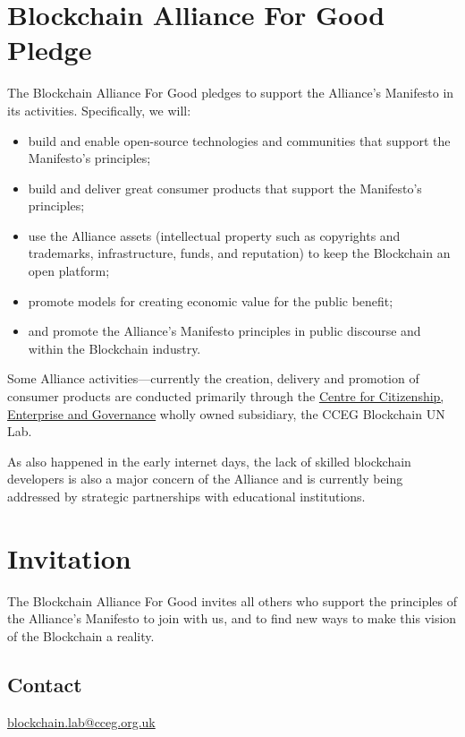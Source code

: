 \documentclass[twoside,twocolumn]{article}
\begin{document}
\section{Blockchain Alliance For Good Pledge}
The Blockchain Alliance For Good pledges to support the Alliance's Manifesto in
its activities. Specifically, we will:

\begin{itemize}
  \item build and enable open-source technologies and communities that support
  the Manifesto’s principles;
  \item build and deliver great consumer products that support the Manifesto’s
  principles;
  \item use the Alliance assets (intellectual property such as copyrights and
  trademarks, infrastructure, funds, and reputation) to keep the Blockchain an
  open platform;
  \item promote models for creating economic value for the public benefit;
  \item and promote the Alliance's Manifesto principles in public discourse and
  within the Blockchain industry.
\end{itemize}

Some Alliance activities—currently the creation, delivery and promotion of
consumer products are conducted primarily through the
\href{www.cceg.org.uk}{Centre for Citizenship, Enterprise and Governance} wholly
owned subsidiary, the CCEG Blockchain UN Lab.

As also happened in the early internet days, the lack of skilled
blockchain developers is also a major concern of the Alliance and is currently
being addressed by strategic partnerships with educational institutions.

\section{Invitation}

The Blockchain Alliance For Good invites all others who support the principles of the
Alliance's Manifesto to join with us, and to find new ways to make this vision
of the Blockchain a reality.

\subsection{Contact}

\href{mailto:blockchain.lab@cceg.org.uk}{blockchain.lab@cceg.org.uk}
\end{document}

